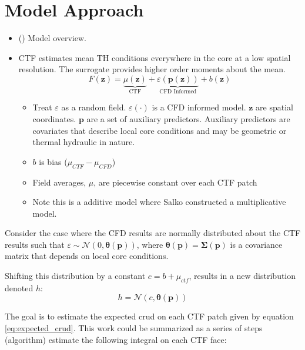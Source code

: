 
\section{Model Approach}

\begin{itemize}
        \item (\checkmark) Model overview.
    \item CTF estimates mean TH conditions everywhere in the core at a low spatial resolution.  The surrogate provides higher order moments about the mean.
    \begin{equation}
    F(\mathbf z) = \underbrace{\mu(\mathbf{z})}_\text{CTF} + \underbrace{\varepsilon({\mathbf p(\mathbf z)})}_\text{CFD Informed} + b(\mathbf{z})
    \end{equation}

    \begin{itemize}
        \item Treat $\varepsilon$ as a random field.  $\varepsilon(\cdot)$ is a CFD informed model. $\mathbf z$ are spatial coordinates. $\mathbf p$ are a set of auxiliary predictors.  Auxiliary predictors are covariates that describe local core conditions and may be geometric or thermal hydraulic in nature.
        \item $b$ is bias ($\mu_{CTF} - \mu_{CFD}$)
        \item Field averages, $\mu$, are piecewise constant over each CTF patch
        \item Note this is a additive model where Salko constructed a multiplicative model.
    \end{itemize}
\end{itemize}

Consider the case where the CFD results are normally distributed about the CTF results such that $\varepsilon \sim \mathcal N(0, \mathbf \theta(\mathbf p))$, where $\mathbf \theta(\mathbf p) = \mathbf \Sigma(\mathbf p)$ is a covariance matrix that depends on local core conditions.

Shifting this distribution by a constant $c=b + \mu_{ctf}$, results in a new distribution denoted $h$:
\begin{equation}
    h = \mathcal N(c, \mathbf \theta(\mathbf p))
\end{equation}

The goal is to estimate the expected crud on each CTF patch given by equation \ref{eq:expected_crud}.
This work could be summarized as a series of steps (algorithm) estimate the following integral on each CTF face:

